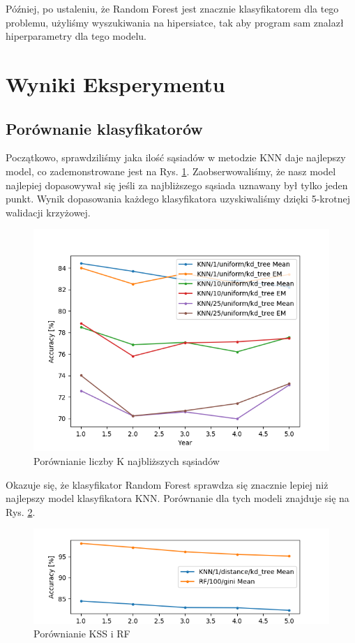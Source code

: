 \documentclass[11pt]{article}
\begin{document}
Później, po ustaleniu, że Random Forest jest znacznie klasyfikatorem dla tego problemu, użyliśmy wyszukiwania na hipersiatce, tak aby program sam znalazł hiperparametry dla tego modelu.
 
\section{Wyniki Eksperymentu}
\subsection{Porównanie klasyfikatorów}
Początkowo, sprawdziliśmy jaka ilość sąsiadów w metodzie KNN daje najlepszy model, co zademonstrowane jest na Rys. \ref{knn_varied_n_neighbors}. Zaobserwowaliśmy, że nasz model najlepiej dopasowywał się jeśli za najbliższego sąsiada uznawany był tylko jeden punkt.
Wynik dopasowania każdego klasyfikatora uzyskiwaliśmy dzięki 5-krotnej walidacji krzyżowej.
\begin{figure}[H]
\caption{Porównianie liczby K najbliższych sąsiadów}
\label{knn_varied_n_neighbors}
\centering
\includegraphics[scale=0.8]{knn_varied_n_neighbors}
\end{figure}

Okazuje się, że klasyfikator Random Forest sprawdza się znacznie lepiej niż najlepszy model klasyfikatora KNN. Porównanie dla tych modeli znajduje się na Rys. \ref{bestknn_vs_bestrf}.
\begin{figure}[H]
\caption{Porównianie KSS i RF}
\label{bestknn_vs_bestrf}
\centering
\includegraphics[scale=0.8]{bestknn_vs_bestrf}
\end{figure}
\end{document}
